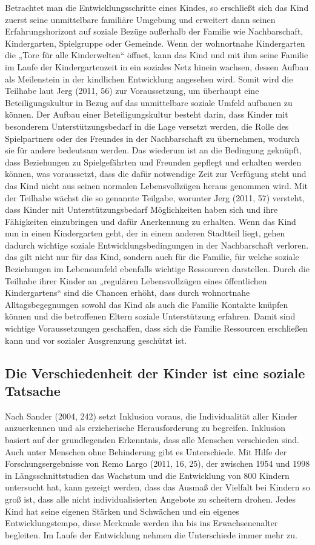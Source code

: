 Betrachtet man die Entwicklungsschritte eines Kindes, so erschließt sich das Kind zuerst seine unmittelbare familiäre Umgebung und erweitert dann seinen Erfahrungshorizont auf soziale Bezüge außerhalb der Familie wie Nachbarschaft, Kindergarten, Spielgruppe oder Gemeinde. Wenn der wohnortnahe Kindergarten die „Tore für alle Kinderwelten“ öffnet, kann das Kind und mit ihm seine Familie im Laufe der Kindergartenzeit in ein soziales Netz hinein wachsen, dessen Aufbau als Meilenstein in der kindlichen Entwicklung angesehen wird. 
Somit wird die Teilhabe laut Jerg (2011, 56) zur Voraussetzung, um überhaupt eine Beteiligungskultur in Bezug auf das unmittelbare soziale Umfeld aufbauen zu können. Der Aufbau einer Beteiligungskultur besteht darin, dass Kinder mit besonderem Unterstützungsbedarf in die Lage versetzt werden, die Rolle des Spielpartners oder des Freundes in der Nachbarschaft zu übernehmen, wodurch sie für andere bedeutsam werden. Das wiederum ist an die Bedingung geknüpft, dass Beziehungen zu Spielgefährten und Freunden gepflegt und erhalten werden können, was voraussetzt, dass die dafür notwendige Zeit zur Verfügung steht und das Kind nicht aus seinen normalen Lebensvollzügen heraus genommen wird.
Mit der Teilhabe wächst die so genannte Teilgabe, worunter Jerg (2011, 57) versteht, dass Kinder mit Unterstützungsbedarf Möglichkeiten haben sich und ihre Fähigkeiten einzubringen und dafür Anerkennung zu erhalten. 
Wenn das Kind nun in einen Kindergarten geht, der in einem anderen Stadtteil liegt, gehen dadurch wichtige soziale Entwicklungsbedingungen in der Nachbarschaft verloren. das gilt nicht nur für das Kind, sondern auch für die Familie, für welche soziale Beziehungen im Lebensumfeld ebenfalls wichtige Ressourcen darstellen. Durch die Teilhabe ihrer Kinder an „regulären Lebensvollzügen eines öffentlichen Kindergartens“ sind die Chancen erhöht, dass durch wohnortnahe Alltagsbegegnungen sowohl das Kind als auch die Familie Kontakte knüpfen können und die betroffenen Eltern soziale Unterstützung erfahren. Damit sind wichtige Voraussetzungen geschaffen, dass sich die Familie Ressourcen erschließen kann und vor sozialer Ausgrenzung geschützt ist. 

\subsection{Die Verschiedenheit der Kinder ist eine soziale Tatsache}\label{sec:heterogenität}
Nach Sander (2004, 242) setzt Inklusion voraus, die Individualität aller Kinder anzuerkennen und als erzieherische Herausforderung zu begreifen. Inklusion basiert auf der grundlegenden Erkenntnis, dass alle Menschen verschieden sind. Auch unter Menschen ohne Behinderung gibt es Unterschiede. Mit Hilfe der Forschungsergebnisse von Remo Largo (2011, 16, 25), der zwischen 1954 und 1998 in Längsschnittstudien das Wachstum und die Entwicklung von 800 Kindern untersucht hat, kann gezeigt werden, dass das Ausmaß der Vielfalt bei Kindern so groß ist, dass alle nicht individualisierten Angebote zu scheitern drohen. Jedes Kind hat seine eigenen Stärken und Schwächen und ein eigenes Entwicklungstempo, diese Merkmale werden ihn bis ins Erwachsenenalter begleiten. Im Laufe der Entwicklung nehmen die Unterschiede immer mehr zu. 

